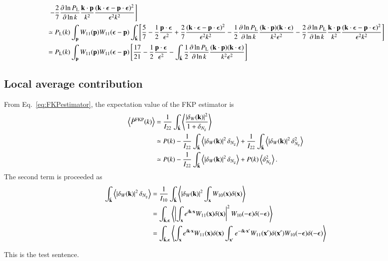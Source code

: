 \documentclass[onecolumn,showpacs,amsmath,amssymb,prd,floatfix,preprintnumbers]{revtex4}
\newcommand{\bx}{{\bf x}}
\newcommand{\bk}{{\bf k}}
\newcommand{\bp}{{\bf p}}
\def\avrg#1{\left\langle #1 \right\rangle}
\begin{document}
\begin{align}
  &~\left. - \frac{2}{7} \frac{\partial \ln P_{\rm L}}{\partial \ln k} \frac{\bk \cdot \bp}{k^2} \frac{(\bk\cdot{\boldsymbol \epsilon} - \bp\cdot{\boldsymbol \epsilon})^2}{\epsilon^2 k^2} \right] \nonumber \\
  &\simeq P_{\rm L}(k) \int_\bp W_{11}(\bp) W_{11}({\boldsymbol \epsilon}-\bp) \int_{\hat{\bk}} \left[ \frac{5}{7} - \frac{1}{2} \frac{\bp\cdot{\boldsymbol \epsilon}}{\epsilon^2} + \frac{2}{7} \frac{(\bk\cdot{\boldsymbol \epsilon} - \bp\cdot{\boldsymbol \epsilon})^2}{\epsilon^2 k^2} - \frac{1}{2} \frac{\partial \ln P_{\rm L}}{\partial \ln k} \frac{(\bk \cdot \bp)(\bk\cdot{\boldsymbol \epsilon})}{k^2\epsilon^2} - \frac{2}{7} \frac{\partial \ln P_{\rm L}}{\partial \ln k} \frac{\bk \cdot \bp}{k^2} \frac{(\bk\cdot{\boldsymbol \epsilon} - \bp\cdot{\boldsymbol \epsilon})^2}{\epsilon^2 k^2} \right] \nonumber \\
  &= P_{\rm L}(k) \int_\bp W_{11}(\bp) W_{11}({\boldsymbol \epsilon}-\bp) \left[ \frac{17}{21} - \frac{1}{2} \frac{\bp\cdot{\boldsymbol \epsilon}}{\epsilon^2} - \int_{\hat{\bk}} \frac{1}{2} \frac{\partial \ln P_{\rm L}}{\partial \ln k} \frac{(\bk \cdot \bp)(\bk\cdot{\boldsymbol \epsilon})}{k^2\epsilon^2} \right]
\end{align}

\subsection{Local average contribution}

From Eq.~\ref{eq:FKPestimator}, the expectation value of the FKP estimator is
\begin{align}
  \avrg{\hat{P}^{\rm FKP}(k)} &= \frac{1}{I_{22}} \int_{\hat{\bk}} \avrg{ \frac{\left| \delta_W(\bk) \right|^2}{1+\delta_{N_{\rm g}}} } \nonumber \\
  &\simeq P(k) - \frac{1}{I_{22}} \int_{\hat{\bk}} \avrg{ \left| \delta_W(\bk) \right|^2 \delta_{N_{\rm g}} } + \frac{1}{I_{22}} \int_{\hat{\bk}} \avrg{ \left| \delta_W(\bk) \right|^2 \delta^2_{N_{\rm g}} } \nonumber \\
  &\simeq P(k) - \frac{1}{I_{22}} \int_{\hat{\bk}} \avrg{ \left| \delta_W(\bk) \right|^2 \delta_{N_{\rm g}} } + P(k) \avrg{ \delta^2_{N_{\rm g}} }.
\end{align}
The second term is proceeded as
\begin{align}
  \int_{\hat{\bk}} \avrg{ \left| \delta_W(\bk) \right|^2 \delta_{N_{\rm g}}  }
  &= \frac{1}{I_{10}} \int_{\hat{\bk}} \avrg{ \left| \delta_W(\bk) \right|^2 \int_{\bx} W_{10}(\bx) \delta(\bx) } \nonumber \\
  &= \int_{\hat{\bk}, {\boldsymbol \epsilon}} \avrg{ \left| \int_{\bx} e^{i\bk \cdot \bx} W_{11}(\bx) \delta(\bx) \right|^2 W_{10}(-{\boldsymbol \epsilon}) \delta(-{\boldsymbol \epsilon}) }  \nonumber \\
  &= \int_{\hat{\bk}, {\boldsymbol \epsilon}} \avrg{ \int_{\bx} e^{i\bk \cdot \bx} W_{11}(\bx) \delta(\bx) \int_{\bx'} e^{-i\bk \cdot \bx'} W_{11}(\bx') \delta(\bx') W_{10}(-{\boldsymbol \epsilon}) \delta(-{\boldsymbol \epsilon}) } 
\end{align}

This is the test sentence.

\vspace{\baselineskip}



\end{document}
